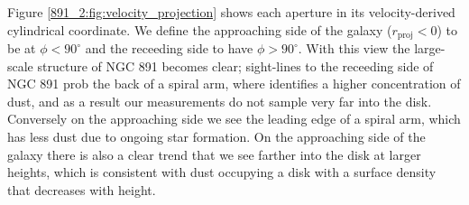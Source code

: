 




Figure \ref{891_2:fig:velocity_projection} shows each aperture in its
velocity-derived cylindrical coordinate. We define the approaching
side of the galaxy ($r_\mathrm{proj} < 0$) to be at $\phi <
90^{\circ}$ and the receeding side to have $\phi > 90^{\circ}$. With
this view the large-scale structure of NGC 891 becomes clear;
sight-lines to the receeding side of NGC 891 prob the back of a spiral
arm, where \citet{Kamphuis07b} identifies a higher concentration of
dust, and as a result our measurements do not sample very far into the
disk. Conversely on the approaching side we see the leading edge of a
spiral arm, which has less dust due to ongoing star formation. On the
approaching side of the galaxy there is also a clear trend that we see
farther into the disk at larger heights, which is consistent with dust
occupying a disk with a surface density that decreases with height.

